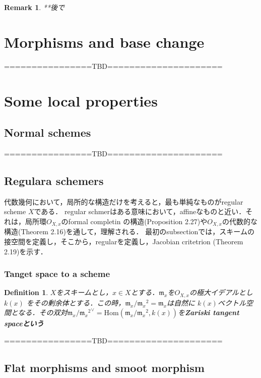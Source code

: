\documentclass{ujarticle}
\newtheorem{dfn}[thm]{Definition}
\newtheorem*{rem}{Remark}
\begin{document}
\begin{rem}
 **後で
\end{rem}

\section{Morphisms and base change}
\label{sec:Morphisms and base change}
  ================TBD=====================

\section{Some local properties}
\label{sec:Some local properties}

\subsection{Normal schemes}
\label{sub:Normal schemes}

  ================TBD=====================

\subsection{Regulara schemers}
\label{sub:Regulara schemers}

代数幾何において，局所的な構造だけを考えると，最も単純なものがregular scheme $X$である．
regular schmerはある意味において，affineなものと近い．それは，局所環$O_{X,x}$のformal completin
の構造(Proposition 2.27)や$O_{X,x}$の代数的な構造(Theorem 2.16)を通して，理解される．
最初のsubsectionでは，スキームの接空間を定義し，そこから，regularを定義し，Jacobian critetrion
(Theorem 2.19)を示す．

\subsubsection{Tanget space to a scheme}
\label{subs:Tanget space to a scheme}
\begin{dfn}
$X$をスキームとし，$x \in X$とする．$\mathfrak{m}_x$を$O_{X,x}$の極大イデアルとし$k(x)$
をその剰余体とする．この時，$\mathfrak{m}_x/{\mathfrak{m}_x}^2=\mathfrak{m}_x$は自然に
$k(x)$ベクトル空間となる．その双対${\mathfrak{m}_x/{\mathfrak{m}_x}^2}^{\vee}=
\mathrm{Hom}(\mathfrak{m}_x/{\mathfrak{m}_x}^2,k(x))$を\bf{Zariski tangent space}という
\end{dfn}
  ================TBD=====================

\subsection{Flat morphisms and smoot morphism}
\label{sub:Flat morphisms and smoot morphism}
\end{document}
